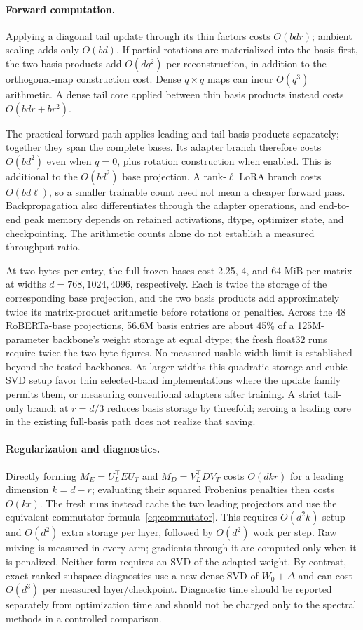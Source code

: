 \documentclass{article}
\begin{document}
\paragraph{Forward computation.}
Applying a diagonal tail update through its thin factors costs $O(bdr)$; ambient scaling adds only $O(bd)$. If partial rotations are materialized into the basis first, the two basis products add $O(dq^2)$ per reconstruction, in addition to the orthogonal-map construction cost. Dense $q\times q$ maps can incur $O(q^3)$ arithmetic. A dense tail core applied between thin basis products instead costs $O(bdr+br^2)$.

The practical forward path applies leading and tail basis products separately; together they span the complete bases. Its adapter branch therefore costs $O(bd^2)$ even when $q=0$, plus rotation construction when enabled. This is additional to the $O(bd^2)$ base projection. A rank-$\ell$ LoRA branch costs $O(bd\ell)$, so a smaller trainable count need not mean a cheaper forward pass. Backpropagation also differentiates through the adapter operations, and end-to-end peak memory depends on retained activations, dtype, optimizer state, and checkpointing. The arithmetic counts alone do not establish a measured throughput ratio.

At two bytes per entry, the full frozen bases cost 2.25, 4, and 64 MiB per matrix at widths $d=768,1024,4096$, respectively. Each is twice the storage of the corresponding base projection, and the two basis products add approximately twice its matrix-product arithmetic before rotations or penalties. Across the 48 RoBERTa-base projections, 56.6M basis entries are about 45\% of a 125M-parameter backbone's weight storage at equal dtype; the fresh float32 runs require twice the two-byte figures. No measured usable-width limit is established beyond the tested backbones. At larger widths this quadratic storage and cubic SVD setup favor thin selected-band implementations where the update family permits them, or measuring conventional adapters after training. A strict tail-only branch at $r=d/3$ reduces basis storage by threefold; zeroing a leading core in the existing full-basis path does not realize that saving.

\paragraph{Regularization and diagnostics.}
Directly forming $M_E=U_L^\top E U_T$ and $M_D=V_L^\top D V_T$ costs $O(dkr)$ for a leading dimension $k=d-r$; evaluating their squared Frobenius penalties then costs $O(kr)$. The fresh runs instead cache the two leading projectors and use the equivalent commutator formula~\eqref{eq:commutator}. This requires $O(d^2k)$ setup and $O(d^2)$ extra storage per layer, followed by $O(d^2)$ work per step. Raw mixing is measured in every arm; gradients through it are computed only when it is penalized. Neither form requires an SVD of the adapted weight. By contrast, exact ranked-subspace diagnostics use a new dense SVD of $W_0+\Delta$ and can cost $O(d^3)$ per measured layer/checkpoint. Diagnostic time should be reported separately from optimization time and should not be charged only to the spectral methods in a controlled comparison.
\end{document}
